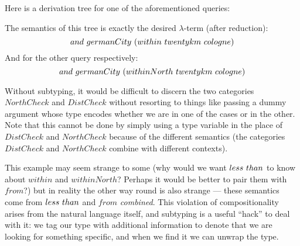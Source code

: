 \documentclass[main.tex]{subfiles}
\begin{document}
\begin{example}
    Here is a derivation tree for one of the aforementioned queries:

    The semantics of this tree is exactly the desired $\lambda$-term (after reduction):
    \[ and \text{ } germanCity \text{ } (within \text{ } twentykm \text{ } cologne) \]
    And for the other query respectively:
    \[ and \text{ } germanCity \text{ } (withinNorth \text{ } twentykm \text{ } cologne) \]

    Without subtyping, it would be difficult to discern the two categories
    $NorthCheck$ and $DistCheck$ without resorting to things like passing a
    dummy argument whose type encodes whether we are in one of the cases or in the other.
    Note that this cannot be done by simply using a type variable in the place
    of $DistCheck$ and $NorthCheck$ because of the different semantics
    (the categories $DistCheck$ and $NorthCheck$
    combine with different contexts).

    This example may seem strange to some (why would
    we want $less \text{ } than$ to know about $within$ and $withinNorth$?
    Perhaps it would be better to pair them with $from$?) but in reality the
    other way round is also strange --- these semantics come from $less \text{ } than$
    and $from$ \emph{combined}. This violation of compositionality arises
    from the natural language itself, and subtyping is a useful ``hack'' to
    deal with it: we tag our type with additional information to denote that
    we are looking for something specific, and when we find it we can unwrap the
    type.
  \end{example}
\end{document}

